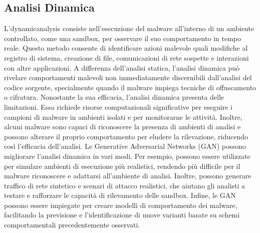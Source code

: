 \subsection{Analisi Dinamica}
L'\gls{dynamicanalysis} consiste nell'esecuzione del malware all'interno di un ambiente controllato, come una sandbox, per osservare il suo comportamento in tempo reale. Questo metodo consente di identificare azioni malevole quali modifiche al registro di sistema, creazione di file, comunicazioni di rete sospette e interazioni con altre applicazioni. A differenza dell'analisi statica, l'analisi dinamica può rivelare comportamenti malevoli non immediatamente discernibili dall'analisi del codice sorgente, specialmente quando il malware impiega tecniche di offuscamento o cifratura.
Nonostante la sua efficacia, l'analisi dinamica presenta delle limitazioni. Essa richiede risorse computazionali significative per eseguire i campioni di malware in ambienti isolati e per monitorarne le attività. Inoltre, alcuni malware sono capaci di riconoscere la presenza di ambienti di analisi e possono alterare il proprio comportamento per eludere la rilevazione, riducendo così l'efficacia dell'analisi.
Le Generative Adversarial Networks (GAN) possono migliorare l'analisi dinamica in vari modi. Per esempio, possono essere utilizzate per simulare ambienti di esecuzione più realistici, rendendo più difficile per il malware riconoscere e adattarsi all'ambiente di analisi. Inoltre, possono generare traffico di rete sintetico e scenari di attacco realistici, che aiutano gli analisti a testare e rafforzare le capacità di rilevamento delle sandbox. Infine, le GAN possono essere impiegate per creare modelli di comportamento dei malware, facilitando la previsione e l'identificazione di nuove varianti basate su schemi comportamentali precedentemente osservati.

